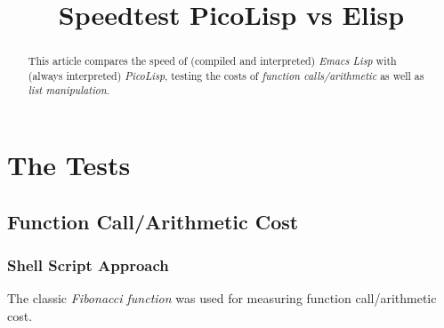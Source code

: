 \title{Speedtest PicoLisp vs Elisp}

\maketitle





% 


\begin{abstract}
  This article compares the speed of (compiled and interpreted)
  \emph{Emacs Lisp} with (always interpreted) \emph{PicoLisp}, testing
  the costs of \emph{function calls/arithmetic} as well as \emph{list
    manipulation}. 
\end{abstract}

\section{The Tests}
\label{sec:pl-vs-elisp-speedtest-picolisp-vs-emacs-lisp}

\subsection{Function Call/Arithmetic Cost}
\label{sec:pl-vs-elisp-function-call/arithmetic-cost}

\subsubsection{Shell Script Approach}
\label{sec:pl-vs-elisp-shell-script-approach}

The classic \emph{Fibonacci function} was used for measuring function
call/arithmetic cost.

